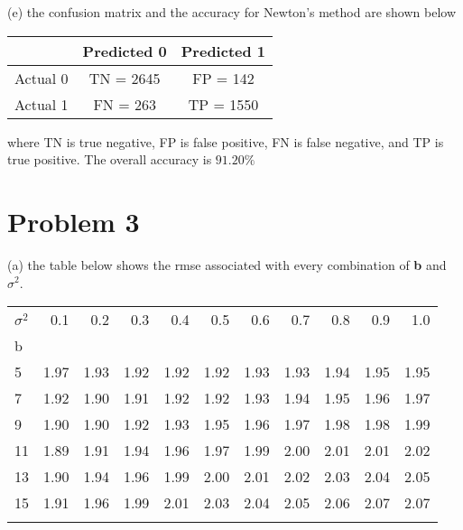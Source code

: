 \documentclass[11pt]{report}
\begin{document}
\pagebreak

\justify (e) the confusion matrix and the accuracy for Newton's method are shown below

\begin{center}
\begin{tabular}{ |c|c|c| } 
 \hline
  & Predicted 0  & Predicted 1 \\ 
 \hline
 Actual 0 & TN = 2645 & FP = 142 \\ 
  \hline
Actual 1  & FN = 263 &  TP = 1550 \\ 
 \hline
\end{tabular}
\end{center}
where TN is true negative, FP is false positive, FN is false negative, and TP is true positive. The overall accuracy is \textbf{$91.20\%$}

\pagebreak

\section* {Problem 3}

\justify (a) the table below shows the rmse associated with every combination of \textbf{b} and $\sigma^{2}$. 

\begin{center}
\begin{tabular}{lrrrrrrrrrr}
\toprule
\;\;\;  $\sigma^2$ &   0.1 &   0.2 &   0.3 &   0.4 &   0.5 &   0.6 &   0.7 &   0.8 &   0.9 &   1.0 \\
b  &       &       &       &       &       &       &       &       &       &       \\
\midrule
5  &  1.97 &  1.93 &  1.92 &  1.92 &  1.92 &  1.93 &  1.93 &  1.94 &  1.95 &  1.95 \\
7  &  1.92 &  1.90 &  1.91 &  1.92 &  1.92 &  1.93 &  1.94 &  1.95 &  1.96 &  1.97 \\
9  &  1.90 &  1.90 &  1.92 &  1.93 &  1.95 &  1.96 &  1.97 &  1.98 &  1.98 &  1.99 \\
11 &  1.89 &  1.91 &  1.94 &  1.96 &  1.97 &  1.99 &  2.00 &  2.01 &  2.01 &  2.02 \\
13 &  1.90 &  1.94 &  1.96 &  1.99 &  2.00 &  2.01 &  2.02 &  2.03 &  2.04 &  2.05 \\
15 &  1.91 &  1.96 &  1.99 &  2.01 &  2.03 &  2.04 &  2.05 &  2.06 &  2.07 &  2.07 \\
\bottomrule
\label{table:rmse_table}
\end{tabular}
\end{center}
\end{document}
